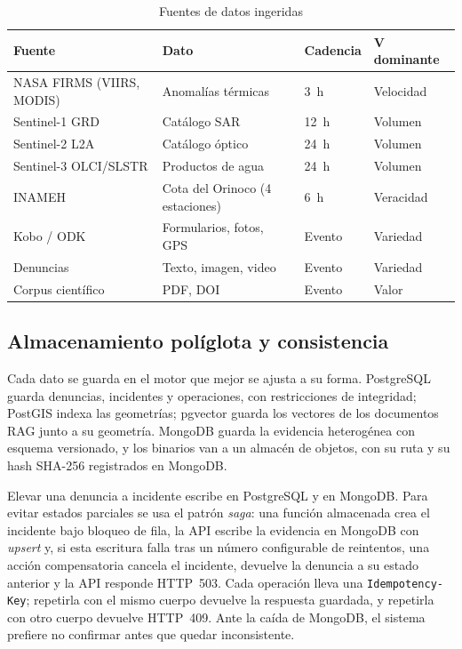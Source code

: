 \documentclass[conference]{IEEEtran}
\begin{document}
\begin{table}[!t]
\caption{Fuentes de datos ingeridas}
\label{tab:fuentes}
\centering
\footnotesize
\setlength{\tabcolsep}{3pt}
\begin{tabular}{@{}p{24mm} p{24mm} l l@{}}
\toprule
Fuente & Dato & Cadencia & V dominante \\
\midrule
NASA FIRMS (VIIRS, MODIS) & Anomalías térmicas & 3~h & Velocidad \\
Sentinel-1 GRD & Catálogo SAR & 12~h & Volumen \\
Sentinel-2 L2A & Catálogo óptico & 24~h & Volumen \\
Sentinel-3 OLCI/SLSTR & Productos de agua & 24~h & Volumen \\
INAMEH & Cota del Orinoco (4 estaciones) & 6~h & Veracidad \\
Kobo / ODK & Formularios, fotos, GPS & Evento & Variedad \\
Denuncias & Texto, imagen, video & Evento & Variedad \\
Corpus científico & PDF, DOI & Evento & Valor \\
\bottomrule
\end{tabular}
\end{table}

\subsection{Almacenamiento políglota y consistencia}
Cada dato se guarda en el motor que mejor se ajusta a su forma. PostgreSQL guarda denuncias, incidentes y operaciones, con restricciones de integridad; PostGIS indexa las geometrías; pgvector guarda los vectores de los documentos RAG junto a su geometría. MongoDB guarda la evidencia heterogénea con esquema versionado, y los binarios van a un almacén de objetos, con su ruta y su hash SHA-256 registrados en MongoDB.

Elevar una denuncia a incidente escribe en PostgreSQL y en MongoDB. Para evitar estados parciales se usa el patrón \emph{saga}: una función almacenada crea el incidente bajo bloqueo de fila, la API escribe la evidencia en MongoDB con \emph{upsert} y, si esta escritura falla tras un número configurable de reintentos, una acción compensatoria cancela el incidente, devuelve la denuncia a su estado anterior y la API responde HTTP~503. Cada operación lleva una \texttt{Idempotency-Key}; repetirla con el mismo cuerpo devuelve la respuesta guardada, y repetirla con otro cuerpo devuelve HTTP~409. Ante la caída de MongoDB, el sistema prefiere no confirmar antes que quedar inconsistente.
\end{document}
